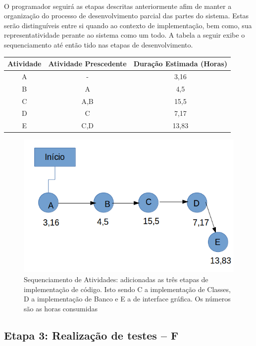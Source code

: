 \documentclass[12pt,a4paper]{article}
\begin{document}
		\paragraph{}O programador seguirá as etapas descritas anteriormente afim de manter a organização do processo de desenvolvimento parcial das partes do sistema. Estas serão distinguíveis entre si quando ao contexto de implementação, bem como, sua representatividade perante ao sistema como um todo. A tabela a seguir exibe o sequenciamento até então tido nas etapas de desenvolvimento.
        \begin{table}[!ht]
        \centering
        \begin{tabular}{|c|c|c|}
        \hline 
        Atividade & Atividade Prescedente & Duração Estimada (Horas) \\ 
        \hline 
		A & - & 3,16 \\ 
		\hline 
		B & A & 4,5 \\  
        \hline 
        C & A,B & 15,5 \\ 
        \hline 
        D & C & 7,17 \\ 
        \hline 
        E & C,D & 13,83 \\ 
        \hline 
        \end{tabular} 
        \end{table} 
        \begin{figure}[!ht]       		
			\includegraphics[scale=0.5]{002.png}
			\caption{Sequenciamento de Atividades: adicionadas as três etapas de implementação de código. Isto sendo C a implementação de Classes, D a implementação de Banco e E a de interface gráfica. Os números são as horas consumidas}
			\end{figure}
		\subsection{Etapa 3: Realização de testes -- F}
		
\end{document}
